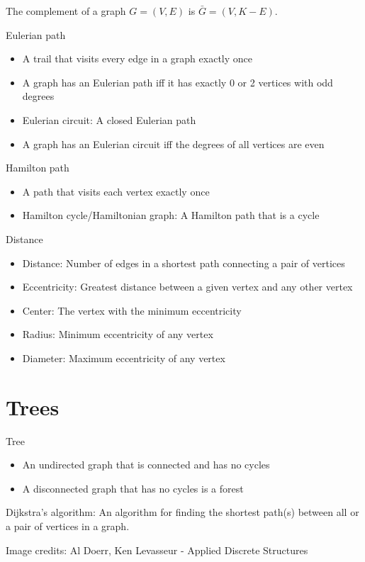 \documentclass{article}
\begin{document}
The complement of a graph $G = (V, E)$ is $\bar{G} = (V, K - E)$.

Eulerian path
\begin{itemize}
    \item A trail that visits every edge in a graph exactly once
    \item A graph has an Eulerian path iff it has exactly 0 or 2 vertices with odd degrees
    \item Eulerian circuit: A closed Eulerian path
    \item A graph has an Eulerian circuit iff the degrees of all vertices are even
\end{itemize}

Hamilton path
\begin{itemize}
    \item A path that visits each vertex exactly once
    \item Hamilton cycle/Hamiltonian graph: A Hamilton path that is a cycle
\end{itemize}

Distance
\begin{itemize}
    \item Distance: Number of edges in a shortest path connecting a pair of vertices
    \item Eccentricity: Greatest distance between a given vertex and any other vertex
    \item Center: The vertex with the minimum eccentricity
    \item Radius: Minimum eccentricity of any vertex
    \item Diameter: Maximum eccentricity of any vertex
\end{itemize}

\section{Trees}

Tree
\begin{itemize}
    \item An undirected graph that is connected and has no cycles
    \item A disconnected graph that has no cycles is a forest
\end{itemize}

Dijkstra's algorithm: An algorithm for finding the shortest path(s) between all or a pair of vertices in a graph.

Image credits: Al Doerr, Ken Levasseur - Applied Discrete Structures
\end{document}
